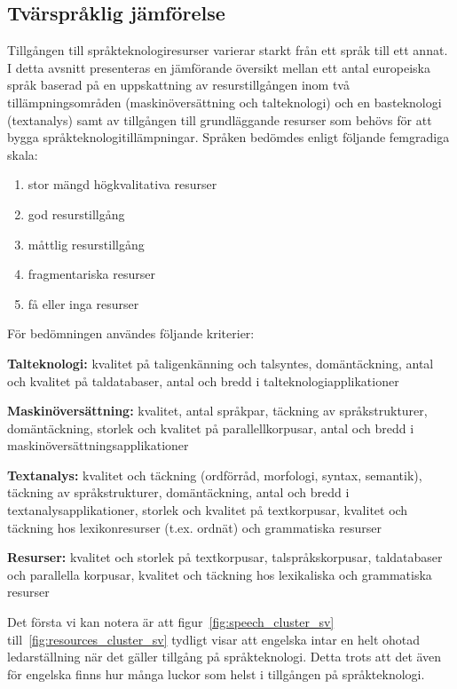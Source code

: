 \begin{multicols}{2}
\subsection{Tvärspråklig jämförelse}

Tillgången till språkteknologiresurser varierar starkt från ett språk
till ett annat. I detta avsnitt presenteras en jämförande översikt
mellan ett antal europeiska språk baserad på en uppskattning av
resurstillgången inom två tillämpningsområden (maskinöversättning och
talteknologi) och en basteknologi (text\-ana\-lys) samt av tillgången till
grundläggande resurser som behövs för att bygga
språkteknologitillämpningar. Språken bedömdes enligt följande
femgradiga skala:

\begin{enumerate}[itemsep=0pt,parsep=0pt]
\item stor mängd högkvalitativa resurser
\item god resurstillgång
\item måttlig resurstillgång
\item fragmentariska resurser
\item få eller inga resurser
\end{enumerate}

För bedömningen användes följande kriterier:

\textbf{Talteknologi:} kvalitet på taligenkänning och talsyntes,
domäntäckning, antal och kvalitet på taldatabaser, antal och bredd i
talteknologiapplikationer

\textbf{Maskinöversättning:} kvalitet, antal språkpar, täckning av
språkstrukturer, domäntäckning, storlek och kvalitet på
parallellkorpusar, antal och bredd i maskinöversättningsapplikationer

\textbf{Textanalys:} kvalitet och täckning (ordförråd, morfologi,
syntax, semantik), täckning av språkstrukturer, domäntäckning, antal
och bredd i textanalysapplikationer, storlek och kvalitet på
textkorpusar, kvalitet och täckning hos lexikonresurser (t.ex. ordnät)
och grammatiska resurser

\textbf{Resurser:} kvalitet och storlek på textkorpusar,
talspråkskorpusar, taldatabaser och parallella korpusar, kvalitet och
täckning hos lexikaliska och grammatiska resurser


Det första vi kan notera är att figur~\ref{fig:speech_cluster_sv}
till~\ref{fig:resources_cluster_sv} tydligt visar att engelska intar
en helt ohotad ledarställning när det gäller tillgång på
språkteknologi. Detta trots att det även för engelska finns hur många
luckor som helst i tillgången på språkteknologi.


\end{multicols}

